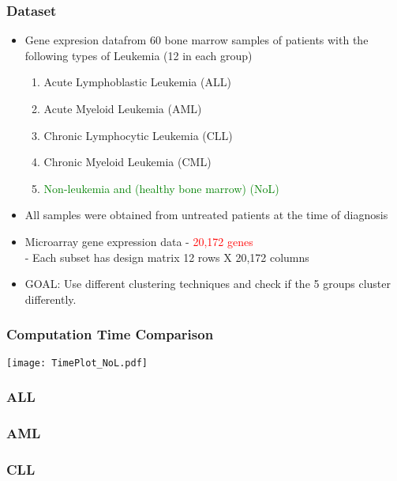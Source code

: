 \documentclass[10pt,dvipsnames,table]{beamer}
\begin{document}
\begin{frame}
\frametitle{Dataset}
\begin{itemize}
\pause \item Gene expresion data\footnotemark from 60 bone marrow samples of patients with the following types of Leukemia (12 in each group)
\begin{enumerate}
\item Acute Lymphoblastic Leukemia (ALL)
\item Acute Myeloid Leukemia (AML)
\item Chronic Lymphocytic Leukemia (CLL)
\item Chronic Myeloid Leukemia (CML)
\item \textcolor{green}{Non-leukemia and (healthy bone marrow) (NoL)}
\end{enumerate}
\pause \item All samples were obtained from untreated patients at the time of diagnosis
\pause \item Microarray gene expression data - \textcolor{red}{20,172 genes} \\
\hspace{0.5cm} - Each subset has design matrix 12 rows X 20,172 columns
\pause \item GOAL: Use different clustering techniques and check if the 5 groups cluster differently.
\end{itemize}
\end{frame}

\begin{frame}
\frametitle{Computation Time Comparison}
\texttt{[image: TimePlot\_NoL.pdf]}
\end{frame}

\begin{frame}
\frametitle{ALL}

\end{frame}

\begin{frame}
\frametitle{AML}

\end{frame}

\begin{frame}
\frametitle{CLL}

\end{frame}
\end{document}

